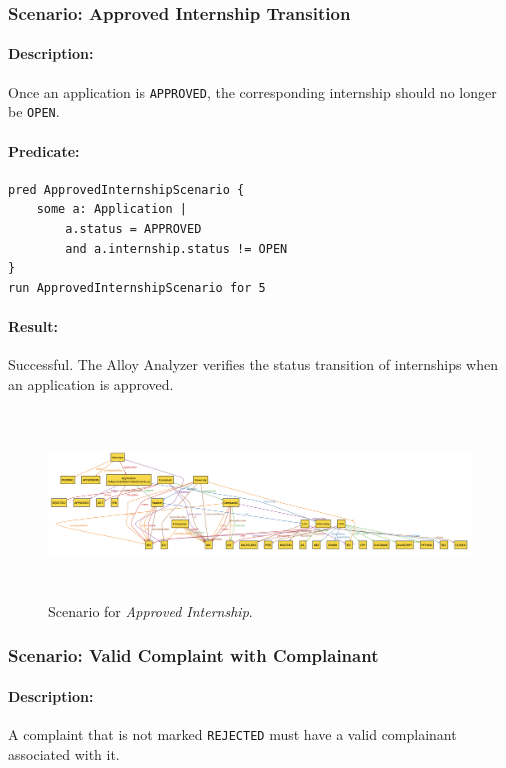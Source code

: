 \subsubsection{Scenario: Approved Internship Transition}
\paragraph{Description:} Once an application is \texttt{APPROVED}, the corresponding internship should no longer be \texttt{OPEN}.
\paragraph{Predicate:}
\begin{verbatim}
pred ApprovedInternshipScenario {
    some a: Application |
        a.status = APPROVED
        and a.internship.status != OPEN
}
run ApprovedInternshipScenario for 5
\end{verbatim}
\paragraph{Result:} Successful. The Alloy Analyzer verifies the status transition of internships when an application is approved.


\begin{figure}[H]
    \centering
    \includegraphics[width=1\linewidth, height=5cm]{JhaBhatiaSharma/Images/Scenario 2.png}
    \caption{Scenario for \textit{Approved Internship}.}
    \label{fig:scenario2}
\end{figure}
\subsubsection{Scenario: Valid Complaint with Complainant}
\paragraph{Description:} A complaint that is not marked \texttt{REJECTED} must have a valid complainant associated with it.
